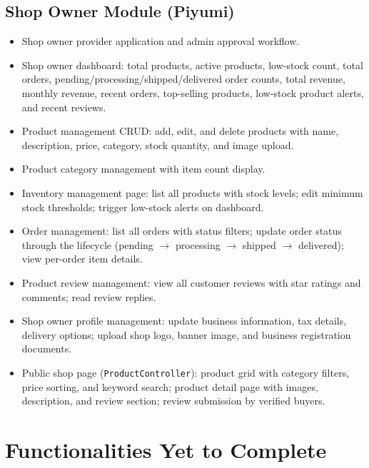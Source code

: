 \documentclass[12pt,a4paper]{report}
\begin{document}
\subsection{Shop Owner Module (Piyumi)}

\begin{itemize}[leftmargin=1.5cm]
  \item Shop owner provider application and admin approval workflow.
  \item Shop owner dashboard: total products, active products, low-stock count, total orders, pending/processing/shipped/delivered order counts, total revenue, monthly revenue, recent orders, top-selling products, low-stock product alerts, and recent reviews.
  \item Product management CRUD: add, edit, and delete products with name, description, price, category, stock quantity, and image upload.
  \item Product category management with item count display.
  \item Inventory management page: list all products with stock levels; edit minimum stock thresholds; trigger low-stock alerts on dashboard.
  \item Order management: list all orders with status filters; update order status through the lifecycle (pending $\to$ processing $\to$ shipped $\to$ delivered); view per-order item details.
  \item Product review management: view all customer reviews with star ratings and comments; read review replies.
  \item Shop owner profile management: update business information, tax details, delivery options; upload shop logo, banner image, and business registration documents.
  \item Public shop page (\texttt{ProductController}): product grid with category filters, price sorting, and keyword search; product detail page with images, description, and review section; review submission by verified buyers.
\end{itemize}

\section{Functionalities Yet to Complete}
\end{document}
